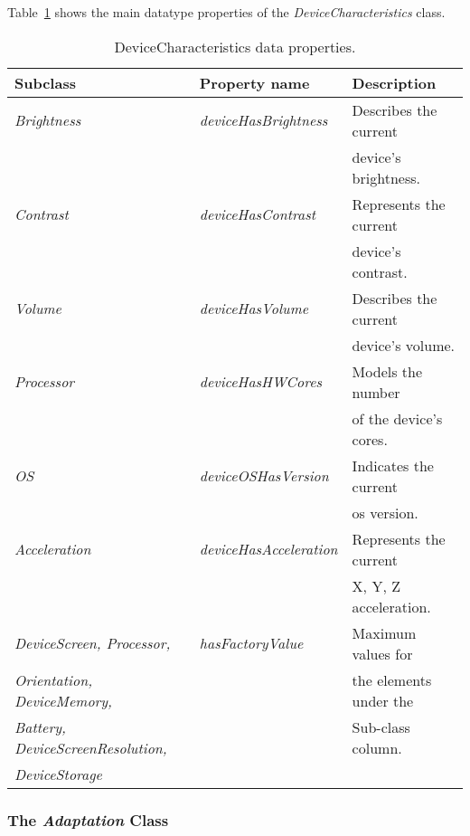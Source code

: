 Table~\ref{tbl:device_characteristics_ontology} shows the main datatype properties
of the \textit{DeviceCharacteristics} class.


\begin{table}
  \caption{DeviceCharacteristics data properties.}
 \label{tbl:device_characteristics_ontology}
\footnotesize
\centering
 \begin{tabular}{l l l}
  \hline 
  \textbf{Subclass} 	& \textbf{Property name} 	& \textbf{Description}		\\
  \hline
  \textit{Brightness}	& \textit{deviceHasBrightness}	& Describes the current		\\
			& 				& device’s brightness.		\\
  \textit{Contrast}	& \textit{deviceHasContrast}	& Represents the current 	\\
  			& 				& device’s contrast.		\\
  \textit{Volume}	& \textit{deviceHasVolume}	& Describes the current		\\
   			& 				& device’s volume.		\\
  \textit{Processor}	& \textit{deviceHasHWCores}	& Models the number 		\\
			& 				& of the device’s cores.	\\
  \textit{OS}		& \textit{deviceOSHasVersion}	& Indicates the current		\\
			& 				& \ac{os} version.		\\
  \textit{Acceleration}	& \textit{deviceHasAcceleration}& Represents the current 	\\
			& 				& X, Y, Z acceleration.		\\
  \textit{DeviceScreen,	Processor,}& \textit{hasFactoryValue}& Maximum values for 	\\
\textit{Orientation, DeviceMemory,}& 			& the elements under the  	\\
\textit{Battery, DeviceScreenResolution,} & 		& Sub-class column.  		\\
\textit{DeviceStorage} 	& 				& 				\\
  \hline

\end{tabular}
\end{table}


\subsubsection{The \textit{Adaptation} Class}
\label{sec:adaptation_class}

